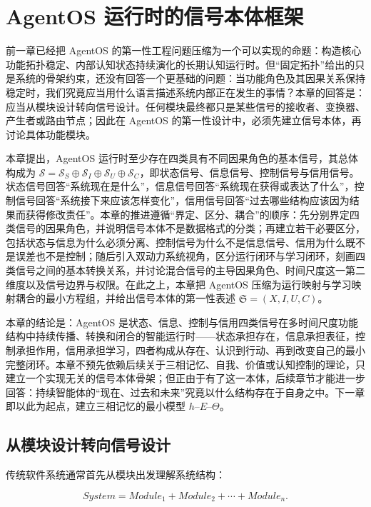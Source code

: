 \chapter{AgentOS 运行时的信号本体框架}

\begin{chapterlead}
前一章已经把 AgentOS 的第一性工程问题压缩为一个可以实现的命题：构造核心功能拓扑稳定、内部认知状态持续演化的长期认知运行时。但“固定拓扑”给出的只是系统的骨架约束，还没有回答一个更基础的问题：当功能角色及其因果关系保持稳定时，我们究竟应当用什么语言描述系统内部正在发生的事情？本章的回答是：应当从模块设计转向信号设计。任何模块最终都只是某些信号的接收者、变换器、产生者或路由节点；因此在 AgentOS 的第一性设计中，必须先建立信号本体，再讨论具体功能模块。

本章提出，AgentOS 运行时至少存在四类具有不同因果角色的基本信号，其总体构成为 $\mathcal{S}=\mathcal{S}_S\oplus\mathcal{S}_I\oplus\mathcal{S}_U\oplus\mathcal{S}_C$，即状态信号、信息信号、控制信号与信用信号。状态信号回答“系统现在是什么”，信息信号回答“系统现在获得或表达了什么”，控制信号回答“系统接下来应该怎样变化”，信用信号回答“过去哪些结构应该因为结果而获得修改责任”。本章的推进遵循“界定、区分、耦合”的顺序：先分别界定四类信号的因果角色，并说明信号本体不是数据格式的分类；再建立若干必要区分，包括状态与信息为什么必须分离、控制信号为什么不是信息信号、信用为什么既不是误差也不是控制；随后引入双动力系统视角，区分运行闭环与学习闭环，刻画四类信号之间的基本转换关系，并讨论混合信号的主导因果角色、时间尺度这一第二维度以及信号边界与权限。在此之上，本章把 AgentOS 压缩为运行映射与学习映射耦合的最小方程组，并给出信号本体的第一性表述 $\mathfrak{S}=(X,I,U,C)$。

本章的结论是：AgentOS 是状态、信息、控制与信用四类信号在多时间尺度功能结构中持续传播、转换和闭合的智能运行时——状态承担存在，信息承担表征，控制承担作用，信用承担学习，四者构成从存在、认识到行动、再到改变自己的最小完整闭环。本章不预先依赖后续关于三相记忆、自我、价值或认知控制的理论，只建立一个实现无关的信号本体骨架；但正由于有了这一本体，后续章节才能进一步回答：持续智能体的“现在、过去和未来”究竟以什么结构存在于自身之中。下一章即以此为起点，建立三相记忆的最小模型 $h$--$E$--$\Theta$。
\end{chapterlead}

\section{从模块设计转向信号设计}

传统软件系统通常首先从模块出发理解系统结构：

\[
System
=
Module_1
+
Module_2
+
\cdots
+
Module_n.
\]

